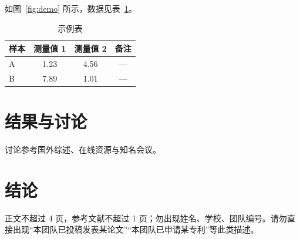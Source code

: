 \documentclass[header=true]{culscart}
\begin{document}
如图~\ref{fig:demo} 所示，数据见表~\ref{tab:demo}。

\begin{table}[htbp]
  \centering
  \caption{示例表}\label{tab:demo}
  \begin{tabular}{lccc}
    \toprule
    样本 & 测量值 1 & 测量值 2 & 备注 \\
    \midrule
    A & 1.23 & 4.56 & --- \\
    B & 7.89 & 1.01 & --- \\
    \bottomrule
  \end{tabular}
\end{table}

\section{结果与讨论}
讨论参考国外综述\cite{smith2021review}、在线资源\cite{ncbi2024}与知名会议\cite{chen2022conf}。

\section{结论}
正文不超过 4 页，参考文献不超过 1 页；勿出现姓名、学校、团队编号。请勿直接出现“本团队已投稿发表某论文”“本团队已申请某专利”等此类描述。

\printbibliography[heading=cnref]
\end{document}
